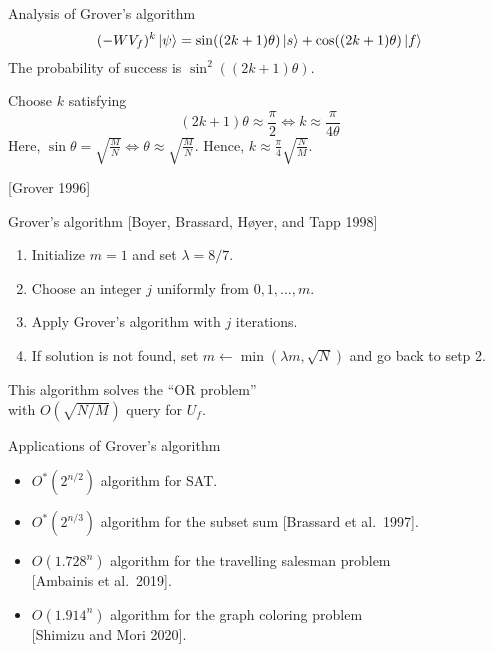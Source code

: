 \documentclass{beamer}
\newcommand\emm[1]{\textcolor{redorange}{{#1}}}
\begin{document}
\begin{frame}{Analysis of Grover's algorithm}
\begin{equation*}
(-WV_f)^k \ket{\psi} = \sin((2k + 1)\theta)\ket{s} + \cos((2k+1)\theta)\ket{f}
\end{equation*}
The probability of success is \emm{$\sin^2((2k+1)\theta)$}.

\vspace{1em}
Choose $k$ satisfying
\begin{equation*}
(2k+1)\theta \approx \frac{\pi}2
\iff k \approx \frac{\pi}{4\theta}
\end{equation*}
Here, $\sin\theta = \sqrt{\frac{M}{N}} \iff \theta\approx\sqrt{\frac{M}{N}}$.
Hence, $k\approx \frac{\pi}4\sqrt{\frac{N}{M}}$.

\vspace{2em}
[Grover 1996]
\end{frame}

\begin{frame}{Grover's algorithm}
[Boyer, Brassard, H\o yer, and Tapp 1998]
\begin{enumerate}
\item Initialize $m = 1$ and set $\lambda = 8/7$.
\item Choose an integer $j$ uniformly from $0,1,\dotsc, m$.
\item Apply Grover's algorithm with $j$ iterations.
\item If solution is not found, set $m\leftarrow\min(\lambda m, \sqrt{N})$ and go back to setp 2.
\end{enumerate}

\vspace{3em}
\centering
This algorithm solves the ``OR problem''\\
 with $O(\sqrt{N/M})$ query for $U_f$.
\end{frame}

\begin{frame}{Applications of Grover's algorithm}
\begin{itemize}
\setlength{\itemsep}{2em}
\item $O^*(2^{n/2})$ algorithm for SAT.
\item $O^*(2^{n/3})$ algorithm for the subset sum [Brassard et al.\ 1997].
\item $O(1.728^{n})$ algorithm for the travelling salesman problem\\
{[Ambainis et al.\ 2019]}.
\item $O(1.914^{n})$ algorithm for the graph coloring problem\\
{[Shimizu and Mori 2020]}.
\end{itemize}
\end{frame}
\end{document}
